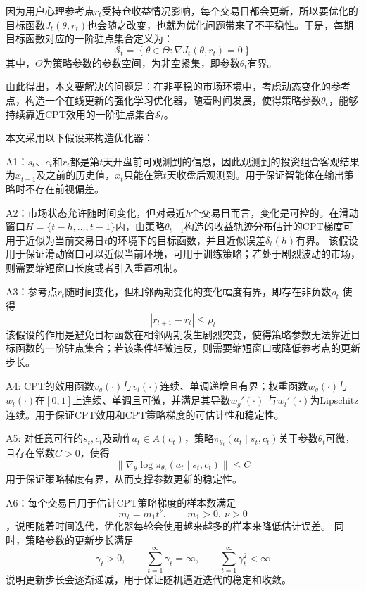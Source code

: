 因为用户心理参考点$r_t$受持仓收益情况影响，每个交易日都会更新，所以要优化的目标函数$J_t(\theta,r_t)$也会随之改变，也就为优化问题带来了不平稳性。于是，每期目标函数对应的一阶驻点集合定义为：
\begin{equation}
\mathcal{S}_t=\left\{\theta \in \Theta:\nabla J_t(\theta,r_t)=0\right\}
\end{equation}
其中，$\Theta$为策略参数的参数空间，为非空紧集，即参数${\theta_t}$有界。

由此得出，本文要解决的问题是：在非平稳的市场环境中，考虑动态变化的参考点，构造一个在线更新的强化学习优化器，随着时间发展，使得策略参数$\theta_t$，能够持续靠近CPT效用的一阶驻点集合$\mathcal{S}_t$。

本文采用以下假设来构造优化器：

A1：$s_t$、$c_t$和$r_t$都是第$t$天开盘前可观测到的信息，因此观测到的投资组合客观结果为$x_{t-1}$及之前的历史值，$x_t$只能在第$t$天收盘后观测到。用于保证智能体在输出策略时不存在前视偏差。

A2：市场状态允许随时间变化，但对最近$h$个交易日而言，变化是可控的。在滑动窗口$H=\{t-h,\dots,t-1\}$内，由策略$\theta_{t-1}$构造的收益轨迹分布估计的CPT梯度可用于近似为当前交易日$t$的环境下的目标函数，并且近似误差$\delta_t(h)$有界。
该假设用于保证滑动窗口可以近似当前环境，可用于训练策略；若处于剧烈波动的市场，则需要缩短窗口长度或者引入重置机制。

A3：参考点$r_t$随时间变化，但相邻两期变化的变化幅度有界，即存在非负数$\rho_t$ 使得
\begin{equation}
|r_{t+1}-r_t|\le \rho_t
\end{equation}
该假设的作用是避免目标函数在相邻两期发生剧烈突变，使得策略参数无法靠近目标函数的一阶驻点集合；若该条件轻微违反，则需要缩短窗口或降低参考点的更新步长。

A4: CPT的效用函数$v_g(\cdot)$与$v_l(\cdot)$连续、单调递增且有界；权重函数$w_g(\cdot)$与$w_l(\cdot)$在$[0,1]$上连续、单调且可微，并满足其导数$w_g'(\cdot)$ 与$w_l'(\cdot)$为Lipschitz连续。用于保证CPT效用和CPT策略梯度的可估计性和稳定性。

A5: 对任意可行的$s_t, c_t$及动作$a_t \in A(c_t)$，策略$\pi_{\theta_t}(a_t \mid s_t, c_t)$关于参数$\theta_t$可微，且存在常数$C > 0$，使得
\begin{equation}
\|\nabla_{\theta} \log \pi_{\theta_t}(a_t \mid s_t, c_t)\| \leq C
\end{equation}
用于保证策略梯度有界，从而支撑参数更新的稳定性。

A6：每个交易日用于估计CPT策略梯度的样本数满足
\begin{equation}
m_t = m_1 t^\nu,\qquad m_1>0,\ \nu>0
\end{equation}，说明随着时间迭代，优化器每轮会使用越来越多的样本来降低估计误差。
同时，策略参数的更新步长满足
\begin{equation}
\gamma_t>0,\qquad \sum_{t=1}^{\infty}\gamma_t=\infty,\qquad \sum_{t=1}^{\infty}\gamma_t^2<\infty
\end{equation}
说明更新步长会逐渐递减，用于保证随机逼近迭代的稳定和收敛。

